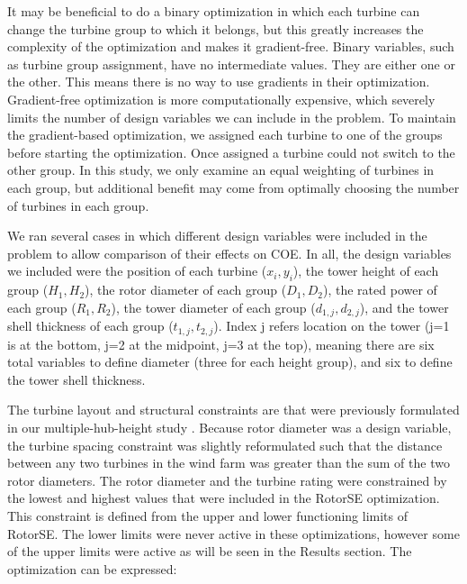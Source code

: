 \documentclass[wes, manuscript]{copernicus}
\begin{document}
        It may be beneficial to do a binary optimization in which each turbine can change the turbine group to which it belongs, but this greatly increases the complexity of the optimization and makes it gradient-free. Binary variables, such as turbine group assignment, have no intermediate values. They are either one or the other. This means there is no way to use gradients in their optimization. Gradient-free optimization is more computationally expensive, which severely limits the number of design variables we can include in the problem. To maintain the gradient-based optimization, we assigned each turbine to one of the groups before starting the optimization. Once assigned a turbine could not switch to the other group. In this study, we only examine an equal weighting of turbines in each group, but additional benefit may come from optimally choosing the number of turbines in each group.%
        
        We ran several cases in which different design variables were included in the problem to allow comparison of their effects on COE. In all, the design variables we included were the position of each turbine ($x_i,y_i$), the tower height of each group ($H_1, H_2$), the rotor diameter of each group ($D_1, D_2$), the rated power of each group ($R_1, R_2$), the tower diameter of each group ($d_{1,j}, d_{2,j}$), and the tower shell thickness of each group ($t_{1,j}, t_{2,j}$). Index j refers location on the tower (j=1 is at the bottom, j=2 at the midpoint, j=3 at the top), meaning there are six total variables to define diameter (three for each height group), and six to define the tower shell thickness.
                
             
          The turbine layout and structural constraints are that were previously formulated in our multiple-hub-height study \citep{stanley2018}. Because rotor diameter was a design variable, the turbine spacing constraint was slightly reformulated such that the distance between any two turbines in the wind farm was greater than the sum of the two rotor diameters.
           The rotor diameter and the turbine rating were constrained by the lowest and highest values that were included in the RotorSE optimization. This constraint is defined from the upper and lower functioning limits of RotorSE. The lower limits were never active in these optimizations, however some of the upper limits were active as will be seen in the Results section.
       The optimization can be expressed:
        
\end{document}
